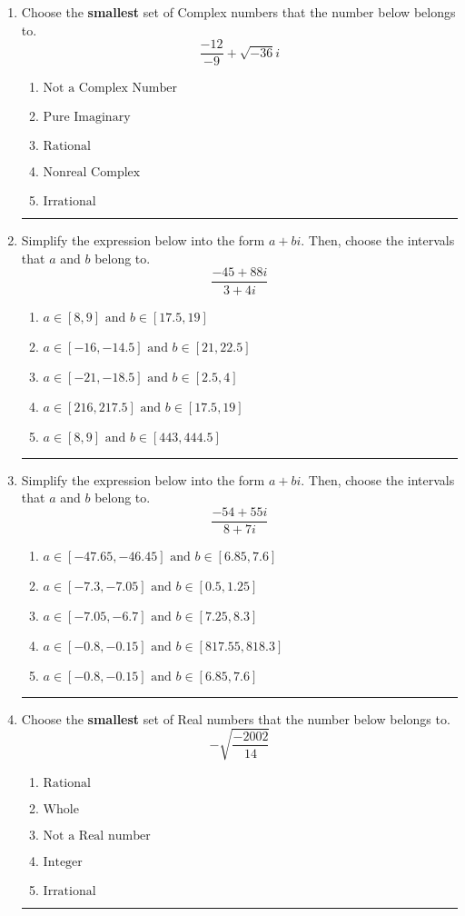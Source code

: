 \documentclass[14pt]{extbook}
\newcommand{\litem}[1]{\item#1\hspace*{-1cm}\rule{\textwidth}{0.4pt}}
\begin{document}
\begin{enumerate}
{\begin{enumerate}[label=\Alph*.]
\end{enumerate} }
\litem{
Choose the \textbf{smallest} set of Complex numbers that the number below belongs to.\[ \frac{-12}{-9}+\sqrt{-36}i \]\begin{enumerate}[label=\Alph*.]
\item \( \text{Not a Complex Number} \)
\item \( \text{Pure Imaginary} \)
\item \( \text{Rational} \)
\item \( \text{Nonreal Complex} \)
\item \( \text{Irrational} \)

\end{enumerate} }
\litem{
Simplify the expression below into the form $a+bi$. Then, choose the intervals that $a$ and $b$ belong to.\[ \frac{-45 + 88 i}{3 + 4 i} \]\begin{enumerate}[label=\Alph*.]
\item \( a \in [8, 9] \text{ and } b \in [17.5, 19] \)
\item \( a \in [-16, -14.5] \text{ and } b \in [21, 22.5] \)
\item \( a \in [-21, -18.5] \text{ and } b \in [2.5, 4] \)
\item \( a \in [216, 217.5] \text{ and } b \in [17.5, 19] \)
\item \( a \in [8, 9] \text{ and } b \in [443, 444.5] \)

\end{enumerate} }
\litem{
Simplify the expression below into the form $a+bi$. Then, choose the intervals that $a$ and $b$ belong to.\[ \frac{-54 + 55 i}{8 + 7 i} \]\begin{enumerate}[label=\Alph*.]
\item \( a \in [-47.65, -46.45] \text{ and } b \in [6.85, 7.6] \)
\item \( a \in [-7.3, -7.05] \text{ and } b \in [0.5, 1.25] \)
\item \( a \in [-7.05, -6.7] \text{ and } b \in [7.25, 8.3] \)
\item \( a \in [-0.8, -0.15] \text{ and } b \in [817.55, 818.3] \)
\item \( a \in [-0.8, -0.15] \text{ and } b \in [6.85, 7.6] \)

\end{enumerate} }
\litem{
Choose the \textbf{smallest} set of Real numbers that the number below belongs to.\[ -\sqrt{\frac{-2002}{14}} \]\begin{enumerate}[label=\Alph*.]
\item \( \text{Rational} \)
\item \( \text{Whole} \)
\item \( \text{Not a Real number} \)
\item \( \text{Integer} \)
\item \( \text{Irrational} \)


\end{enumerate}}
\end{enumerate}
\end{document}
